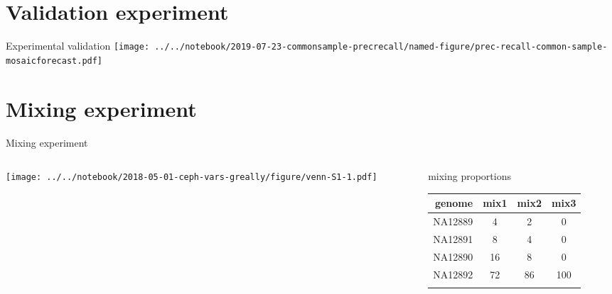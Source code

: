 \documentclass{beamer}
\begin{document}
\section{Validation experiment}

\begin{frame}{Experimental validation}
\texttt{[image: ../../notebook/2019-07-23-commonsample-precrecall/named-figure/prec-recall-common-sample-mosaicforecast.pdf]}
\end{frame}

\section{Mixing experiment}

\begin{frame}{Mixing experiment}
\begin{columns}[t]
\begin{column}{0.5\textwidth}

\texttt{[image: ../../notebook/2018-05-01-ceph-vars-greally/figure/venn-S1-1.pdf]}
\end{column}

\begin{column}{0.5\textwidth}

{\footnotesize
{\large mixing proportions}

\begin{tabular}{r|ccc}
genome & mix1 & mix2 & mix3 \\
\hline
NA12889 & 4 & 2 & 0 \\
NA12891 & 8 & 4 & 0 \\
NA12890 & 16 & 8 & 0 \\
NA12892 & 72 & 86 & 100 \\
& & & \\
\end{tabular}
}
\end{column}
\end{columns}
\end{frame}
\end{document}
